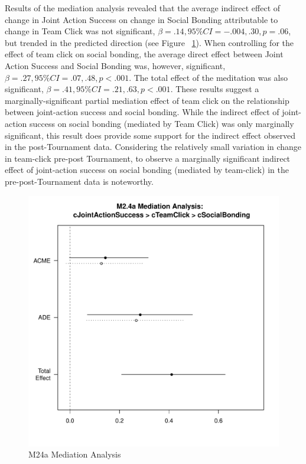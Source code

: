   Results of the mediation analysis revealed that the average indirect effect of change in Joint Action Success on change in Social Bonding attributable to change in Team Click was not significant, $\beta = .14, 95\% CI = -.004 , .30, p = .06$, but trended in the predicted direction (see Figure ~\ref{fig:MLM24aMediationAnalysis}).  When controlling for the effect of team click on social bonding, the average direct effect between Joint Action Success and Social Bonding was, however, significant, $\beta = .27, 95\% CI = .07 , .48, p < .001$.  The total effect of the meditation was also significant, $\beta = .41, 95\% CI = .21 , .63, p < .001$.  These results suggest a marginally-significant partial mediation effect of team click on the relationship between joint-action success and social bonding.  While the indirect effect of joint-action success on social bonding (mediated by Team Click) was only marginally significant, this result does provide some support for the indirect effect observed in the post-Tournament data.  Considering the relatively small variation in change in team-click pre-post Tournament, to observe a marginally significant indirect effect of joint-action success on social bonding (mediated by team-click) in the pre-post-Tournament data is noteworthy.




\begin{figure}[htbp]
  \centering
  \includegraphics[width=\columnwidth]{images/MLM24aMediationAnalysis.pdf}
  \caption{M24a Mediation Analysis}
  \label{fig:MLM24aMediationAnalysis}
\end{figure}



